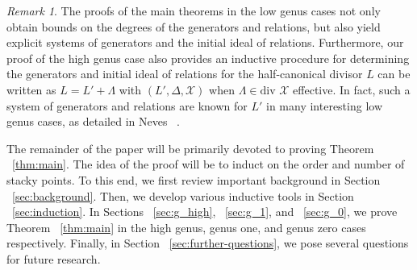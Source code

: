 \documentclass{amsart}
\theoremstyle{plain}
\theoremstyle{definition}
\theoremstyle{remark}
\newtheorem{rem}[thm]{Remark}
\numberwithin{equation}{section}
\newcommand \sx{\mathscr X}
\newcommand \di{\text{div }}
\newcommand \halfcan{L}
\begin{document}
\begin{rem}
The proofs of the main theorems in the low genus cases not only
obtain bounds on the degrees of the generators and relations, but
also yield explicit systems of generators and the initial ideal of
relations. Furthermore, our proof of the high genus case also
provides an inductive procedure for determining the generators and
initial ideal of relations for the half-canonical divisor $\halfcan$ can be written as $\halfcan = \halfcan' + \Lambda$ with
$(\halfcan', \Delta, \sx)$ when $\Lambda \in \di \sx$ effective. In fact, such a system of
generators and relations are known for $\halfcan'$ in many interesting low genus cases,
as detailed in Neves ~\cite[ Section III.4]{neves:halfcan}.
\end{rem}

The remainder of the paper will be primarily devoted to proving
Theorem ~\ref{thm:main}. The idea of the
proof will be to induct on the order and number of stacky points. To this end, we first review important background in
Section ~\ref{sec:background}. Then, we develop various inductive
tools in Section ~\ref{sec:induction}. In Sections ~\ref{sec:g_high},
~\ref{sec:g_1}, and ~\ref{sec:g_0}, we prove Theorem
~\ref{thm:main} in the high genus, genus
one, and genus zero cases respectively. Finally, in Section
~\ref{sec:further-questions}, we pose several questions for future
research.


\end{document}

